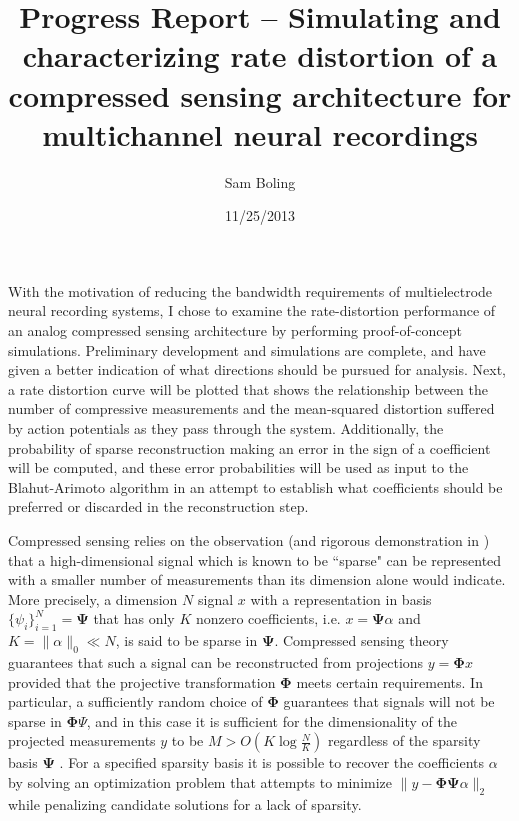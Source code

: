 \documentclass[11pt]{paper}
\title{Progress Report -- Simulating and characterizing rate distortion of a compressed sensing architecture for multichannel neural recordings}
\author{Sam Boling}
\date{11/25/2013}
\begin{document}
\maketitle

With the motivation of reducing the bandwidth requirements of multielectrode
neural recording systems, I chose to examine the rate-distortion performance
of an analog compressed sensing architecture by performing proof-of-concept 
simulations. Preliminary development and simulations are complete, and have
given a better indication of what directions should be pursued for 
analysis. Next, a rate distortion curve will be plotted that shows the
relationship between the number of compressive measurements and the 
mean-squared distortion suffered by action potentials as they pass through
the system. Additionally, the probability of sparse reconstruction 
making an error in the sign of a coefficient will be computed, and these 
error probabilities will be used as input to the Blahut-Arimoto algorithm 
in an attempt to establish what coefficients should be preferred or 
discarded in the reconstruction step.

Compressed sensing relies on the observation (and rigorous demonstration in
\cite{candes2006}) that a high-dimensional signal which is known to be 
``sparse" can be represented with a smaller number of measurements than its 
dimension alone would indicate. More precisely, a dimension $N$ signal 
$x$ with a representation in basis $\{\psi_i\}_{i=1}^N = \mathbf{\Psi}$ that
has only $K$ nonzero coefficients, i.e. $x = \mathbf{\Psi}\alpha$ 
and $K = \|\alpha\|_0 \ll N$, is said to be sparse in $\mathbf{\Psi}$. 
Compressed sensing theory guarantees that such a signal can be reconstructed
from projections $y = \mathbf{\Phi}x$ provided that the projective 
transformation $\mathbf{\Phi}$ meets certain requirements. In particular,
a sufficiently random choice of $\mathbf{\Phi}$ guarantees that signals 
will not be
sparse in $\mathbf{\Phi}{\Psi}$, and in this case it is sufficient for the
dimensionality of the projected measurements $y$ to be 
$M > O\left(K \log \frac{N}{K}\right)$ regardless of the sparsity basis
$\mathbf{\Psi}$ \cite{candes2010}. For a specified sparsity basis it is 
possible to recover the coefficients $\alpha$ by solving an optimization
problem that attempts to minimize 
$\|y - \mathbf{\Phi}\mathbf{\Psi}\alpha\|_2$ 
while penalizing candidate solutions for a lack of sparsity. 
\end{document}
